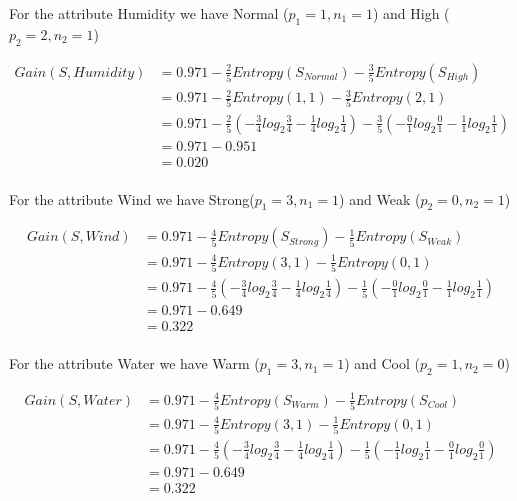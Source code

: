 \documentclass[10pt,a4paper]{article}
\begin{document}
{{{{{{{{{{For the attribute Humidity we have Normal ($p_1=1,n_1=1$) and High ($p_2=2,n_2=1$)

\begin{equation}
\begin{split}
Gain(S,Humidity) &= 0.971 - \frac{2}{5} Entropy(S_{Normal} ) - \frac{3}{5}Entropy(S_{High}) \\
          &= 0.971 - \frac{2}{5} Entropy(1,1) - \frac{3}{5}Entropy(2,1) \\
          &= 0.971 -\frac{2}{5} ( -\frac{3}{4} log_2\frac{3}{4} -\frac{1}{4} log_2\frac{1}{4} ) -           \frac{3}{5}(-\frac{0}{1} log_2\frac{0}{1} - \frac{1}{1}log_2\frac{1}{1} ) \\
          &= 0.971 - 0.951\\
          &= 0.020 \\
\end{split}
\end{equation}

For the attribute Wind we have Strong($p_1=3,n_1=1$) and Weak ($p_2=0,n_2=1$)

\begin{equation}
\begin{split}
Gain(S,Wind) &= 0.971 - \frac{4}{5} Entropy(S_{Strong} ) - \frac{1}{5}Entropy(S_{Weak}) \\
          &= 0.971 - \frac{4}{5} Entropy(3,1) - \frac{1}{5}Entropy(0,1) \\
          &= 0.971 -\frac{4}{5} ( -\frac{3}{4} log_2\frac{3}{4} -\frac{1}{4} log_2\frac{1}{4} ) - \frac{1}{5}(-\frac{0}{1} log_2\frac{0}{1} - \frac{1}{1}log_2\frac{1}{1} ) \\
          &= 0.971 - 0.649\\
          &= 0.322 \\
\end{split}
\end{equation}

For the attribute Water we have Warm ($p_1=3,n_1=1$) and Cool ($p_2=1,n_2=0$)

\begin{equation}
\begin{split}
Gain(S,Water) &= 0.971 - \frac{4}{5} Entropy(S_{Warm} ) - \frac{1}{5}Entropy(S_{Cool}) \\
          &= 0.971 - \frac{4}{5} Entropy(3,1) - \frac{1}{5}Entropy(0,1) \\
          &= 0.971 -\frac{4}{5} ( -\frac{3}{4} log_2\frac{3}{4} -\frac{1}{4} log_2\frac{1}{4} ) - \frac{1}{5}(-\frac{1}{1} log_2\frac{1}{1} - \frac{0}{1}log_2\frac{0}{1} ) \\
          &= 0.971 - 0.649\\
          &= 0.322 \\
\end{split}
\end{equation}

}}}}}}}}}}
\end{document}
